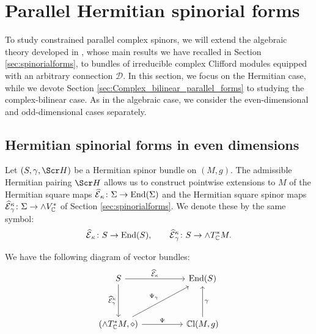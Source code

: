 \documentclass[10pt,a4paper,twoside,reqno]{amsart}
\theoremstyle{plain}
\theoremstyle{definition}
\theoremstyle{remark}
\newcommand{\End}{\mathrm{End}}
\def\C{\mathbb{C}}
\def\scS{\Scr H}
\def\cD{\mathcal{D}}
\def\hcE{\smash{\widehat{\mathcal{E}}}}
\begin{document}

\section{Parallel Hermitian spinorial forms}
\label{sec:Hermitian_parallel_forms}


To study constrained parallel complex spinors, we will extend the algebraic theory developed in \cite{Algebraic_Complex_Square_2025}, whose main results we have recalled in Section \ref{sec:spinorialforms}, to bundles of irreducible complex Clifford modules equipped with an arbitrary connection $\cD$. In this section, we focus on the Hermitian case, while we devote Section \ref{sec:Complex_bilinear_parallel_forms} to studying the complex-bilinear case. As in the algebraic case, we consider the even-dimensional and odd-dimensional cases separately.


\subsection{Hermitian spinorial forms in even dimensions}


Let $(S,\gamma,\scS)$ be a Hermitian spinor bundle on $(M,g)$. The admissible Hermitian pairing $\scS$ allows us to construct pointwise extensions to $M$ of the Hermitian square maps $\hcE_\kappa\colon\Sigma\to\End(\Sigma)$ and the Hermitian square spinor maps $\hcE^\kappa_\gamma\colon\Sigma\to\wedge V^*_\C$ of Section \ref{sec:spinorialforms}. We denote these by the same symbol: $$\hcE_\kappa\colon S\to\End(S),\qquad \hcE^\kappa_\gamma\colon S\to\wedge T^*_\C M.$$

We have the following diagram of vector bundles: $$\begin{tikzcd}
S \arrow[rr, "\widehat{\mathcal{E}}_\kappa"] \arrow[dd, "\widehat{\mathcal{E}}^\kappa_\gamma"'] &  & \mathrm{End}(S)                                   \\
                                                                                                &  &                                                   \\
{(\wedge T^*_{\mathbb{C}}M,\diamond)} \arrow[rr, "\Psi"] \arrow[rruu, "\Psi_\gamma"]            &  & {\mathbb{C}\mathrm{l}(M,g)} \arrow[uu, "\gamma"']
\end{tikzcd}$$
\end{document}
